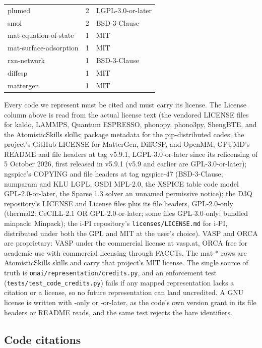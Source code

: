 \documentclass[11pt,a4paper]{article}
\begin{document}
\begin{center}
\begin{tabular}{lrl}
plumed                       & 2  & LGPL-3.0-or-later \\
smol                         & 2  & BSD-3-Clause \\
mat-equation-of-state        & 1  & MIT \\
mat-surface-adsorption       & 1  & MIT \\
rxn-network                  & 1  & BSD-3-Clause \\
diffcsp                      & 1  & MIT \\
mattergen                    & 1  & MIT \\
\bottomrule
\end{tabular}
\end{center}

Every code we represent must be cited and must carry its license. The License
column above is read from the actual license text (the vendored LICENSE files
for kaldo, LAMMPS, Quantum ESPRESSO, phonopy, phono3py, ShengBTE, and the
AtomisticSkills skills; package metadata for the pip-distributed codes; the
project's GitHub LICENSE for MatterGen, DiffCSP, and OpenMM; GPUMD's README and
file headers at tag v5.9.1, LGPL-3.0-or-later since its relicensing of 5 October
2026, first released in v5.9.1 (v5.9 and earlier are GPL-3.0-or-later);
ngspice's COPYING and file headers at tag
ngspice-47 (BSD-3-Clause; numparam and KLU LGPL, OSDI MPL-2.0, the XSPICE
table code model GPL-2.0-or-later, the Sparse 1.3 solver an unnamed
permissive notice); the D3Q
repository's LICENSE and License files plus its file headers, GPL-2.0-only
(thermal2: CeCILL-2.1 OR GPL-2.0-or-later; some files GPL-3.0-only; bundled minpack:
Minpack); the i-PI
repository's \texttt{licenses/LICENSE.md} for i-PI, distributed under both the
GPL and MIT at the user's choice). VASP and
ORCA are proprietary: VASP under the commercial license at vasp.at, ORCA free
for academic use with commercial licensing through FACCTs. The mat-* rows are
AtomisticSkills skills and carry that project's MIT license. The single source
of truth is \texttt{omai/representation/credits.py}, and an enforcement test
(\texttt{tests/test\_code\_credits.py}) fails if any mapped representation lacks a
citation or a license, so no future representation can land uncredited. A GNU
license is written with -only or -or-later, as the code's own version grant in
its file headers or README reads, and the same test rejects the bare identifiers.

\subsection{Code citations}
\label{sec:code-citations}
\end{document}
